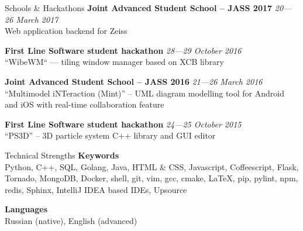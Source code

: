 \documentclass{resume}
\begin{document}
\begin{rSection}{Schools \& Hackathons}        
    {\bf Joint Advanced Student School -- JASS 2017} \hfill {\em 20---26 March 2017} \\
        Web application backend for Zeiss
        
    {\bf First Line Software student hackathon} \hfill {\em 28---29 October 2016} \\
        ``WibeWM`` --- tiling window manager based on XCB library
        
    {\bf Joint Advanced Student School -- JASS 2016} \hfill {\em 21---26 March 2016} \\
        ``Multimodel iNTeraction (Mint)'' -- UML diagram modelling tool for Android and iOS with real-time collaboration feature

    {\bf First Line Software student hackathon} \hfill {\em 24---25 October 2015} \\
        ``PS3D'' -- 3D particle system C++ library and GUI editor
\end{rSection}

\begin{rSection}{Technical Strengths}
    {\bf Keywords} \\ 
        Python, C++, SQL, Golang, Java, HTML \& CSS, Javascript, Coffeescript, Flask, Tornado, MongoDB, Docker, shell, git, vim, gcc, cmake, LaTeX, pip, pylint, npm, redis, Sphinx, IntelliJ IDEA based IDEs, Upsource

    {\bf Languages} \\ 
        Russian (native), English (advanced)
\end{rSection}
\end{document}
